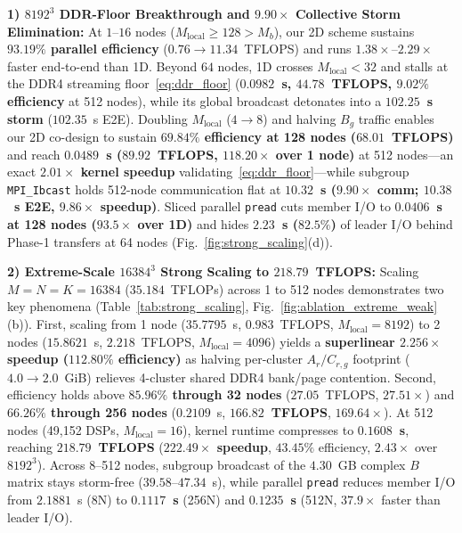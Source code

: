 \documentclass[conference]{IEEEtran}
\begin{document}
\textbf{1) $8192^3$ DDR-Floor Breakthrough and $9.90\times$ Collective Storm Elimination:} At $1$--$16$ nodes ($M_{\mathrm{local}} \ge 128 > M_b$), our 2D scheme sustains \textbf{$93.19\%$ parallel efficiency} ($0.76 \to 11.34$~TFLOPS) and runs $1.38\times$--$2.29\times$ faster end-to-end than 1D. Beyond $64$ nodes, 1D crosses $M_{\mathrm{local}} < 32$ and stalls at the DDR4 streaming floor~\eqref{eq:ddr_floor} (\textbf{$0.0982$~s, $44.78$~TFLOPS, $9.02\%$ efficiency} at 512 nodes), while its global broadcast detonates into a \textbf{$102.25$~s storm} ($102.35$~s E2E). Doubling $M_{\mathrm{local}}$ ($4 \to 8$) and halving $B_g$ traffic enables our 2D co-design to sustain \textbf{$69.84\%$ efficiency at 128 nodes ($68.01$~TFLOPS)} and reach \textbf{$0.0489$~s ($89.92$~TFLOPS, $118.20\times$ over 1 node)} at 512 nodes---an exact \textbf{$2.01\times$ kernel speedup} validating~\eqref{eq:ddr_floor}---while subgroup \texttt{MPI\_Ibcast} holds 512-node communication flat at \textbf{$10.32$~s ($9.90\times$ comm; $10.38$~s E2E, $9.86\times$ speedup)}. Sliced parallel \texttt{pread} cuts member I/O to \textbf{$0.0406$~s at 128 nodes ($93.5\times$ over 1D)} and hides \textbf{$2.23$~s ($82.5\%$)} of leader I/O behind Phase-1 transfers at 64 nodes (Fig.~\ref{fig:strong_scaling}(d)).

\textbf{2) Extreme-Scale $16384^3$ Strong Scaling to $218.79$~TFLOPS:} Scaling $M\!=\!N\!=\!K\!=\!16384$ ($35.184$~TFLOPs) across 1 to 512 nodes demonstrates two key phenomena (Table~\ref{tab:strong_scaling}, Fig.~\ref{fig:ablation_extreme_weak}(b)). First, scaling from 1 node ($35.7795$~s, $0.983$~TFLOPS, $M_{\mathrm{local}}\!=\!8192$) to 2 nodes ($15.8621$~s, $2.218$~TFLOPS, $M_{\mathrm{local}}\!=\!4096$) yields a \textbf{superlinear $2.256\times$ speedup ($112.80\%$ efficiency)} as halving per-cluster $A_r/C_{r,g}$ footprint ($4.0 \to 2.0$~GiB) relieves 4-cluster shared DDR4 bank/page contention. Second, efficiency holds above \textbf{$85.96\%$ through 32 nodes} ($27.05$~TFLOPS, $27.51\times$) and \textbf{$66.26\%$ through 256 nodes} ($0.2109$~s, \textbf{$166.82$~TFLOPS}, $169.64\times$). At 512 nodes (49,152 DSPs, $M_{\mathrm{local}}\!=\!16$), kernel runtime compresses to \textbf{$0.1608$~s}, reaching \textbf{$218.79$~TFLOPS} (\textbf{$222.49\times$ speedup}, $43.45\%$ efficiency, $2.43\times$ over $8192^3$). Across 8--512 nodes, subgroup broadcast of the $4.30$~GB complex $B$ matrix stays storm-free ($39.58$--$47.34$~s), while parallel \texttt{pread} reduces member I/O from $2.1881$~s (8N) to \textbf{$0.1117$~s} (256N) and \textbf{$0.1235$~s} (512N, $37.9\times$ faster than leader I/O).
\end{document}
